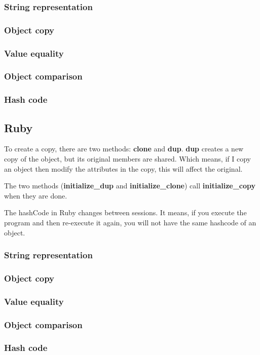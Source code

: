 \documentclass{KodeBook}
\begin{document}
\subsubsection{String representation}

\subsubsection{Object copy}

\subsubsection{Value equality}

\subsubsection{Object comparison}

\subsubsection{Hash code}

\subsection{Ruby}

To create a copy, there are two methods: \textbf{clone} and \textbf{dup}. 
\textbf{dup} creates a new copy of the object, but its original members are shared. 
Which means, if I copy an object then modify the attributes in the copy, this will affect the original.



The two methods (\textbf{initialize\_dup} and \textbf{initialize\_clone}) call \textbf{initialize\_copy} when they are done.


The hashCode in Ruby changes between sessions.
It means, if you execute the program and then re-execute it again, you will not have the same hashcode of an object.

\subsubsection{String representation}

\subsubsection{Object copy}

\subsubsection{Value equality}

\subsubsection{Object comparison}

\subsubsection{Hash code}

\ifx\wholebook\relax\else
% 
% 
	
\end{document}
